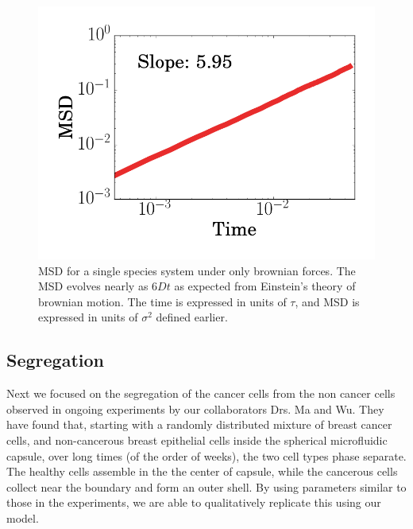 \documentclass[aps,prb,twocolumn,groupedaddress,nofootinbib,floatfix]{revtex4}
\begin{document}
\begin{figure}
  \includegraphics[width=\columnwidth]{brownianMSD.png}
  \caption[brownianMSD]
    {MSD for a single species system under only brownian forces. The MSD evolves nearly as $6Dt$ as expected from Einstein's theory of brownian motion. The time is expressed in units of $\tau$, and MSD is expressed
    in units of $\sigma^2$ defined earlier.}
  \label{fig:brownianMSD}
\end{figure}

\subsection{Segregation}

Next we focused on the segregation of the cancer cells from the non cancer cells
observed in ongoing experiments by our collaborators Drs. Ma and Wu. 
They have found that, starting with a randomly distributed mixture of breast cancer cells,
and non-cancerous breast epithelial cells inside the spherical microfluidic capsule, over long times
(of the order of weeks), the two cell types phase separate. The healthy cells assemble in the the center of capsule,
while the cancerous cells collect near the boundary and form an outer shell. By using parameters similar to those 
in the experiments, we are able to qualitatively replicate this using our model.
\end{document}
